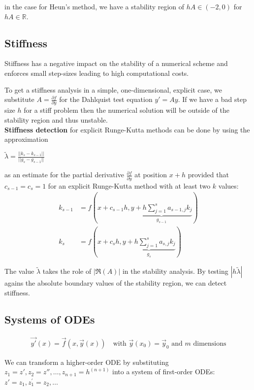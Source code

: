 in the case for Heun's method, we have a stability region of
$hA\in(-2,0)$ for $hA\in\mathbb{R}$.

\subsection{Stiffness}

Stiffness has a negative impact on the stability of a numerical scheme and enforces small step-sizes
leading to high computational costs.

To get a stiffness analysis in a simple, one-dimensional, explicit case, we substitute
$A=\frac{\partial f}{\partial y}$ for the Dahlquist test equation $y'=Ay$.
If we have a bad step size $h$ for a stiff problem then the numerical solution will be outside
of the stability region and thus unstable.
\\[1em]
\textbf{Stiffness detection} for explicit Runge-Kutta methods can be done by using the
approximation

\colorbox{shadecolor}{$
    \displaystyle
    \tilde{\lambda} = \frac{||k_s - k_{s-1}||}{||g_s - g_{s-1}||}
$}

as an estimate for the partial derivative $\frac{\partial f}{\partial y}$ at position $x+h$ provided
that $c_{s-1} = c_s = 1$ for an explicit Runge-Kutta method with at least two $k$ values:
\begin{align*}
    k_{s-1}
    & = f(x+c_{s-1}h,\underbrace{y+h\sum_{j=1}^{s}a_{s-1,j}k_{j}}_{g_{s-1}}) \\
    k_{s}
    & =f(x+c_{s}h,\underbrace{y+h\sum_{j=1}^{s}a_{s,j}k_{j}}_{g_{s}})
\end{align*}

The value $\tilde{\lambda}$ takes the role of $|\Re(A)|$ in the stability analysis.
By testing $|h\tilde\lambda|$ agains the absolute boundary values of the stability region,
we can detect stiffness.

\subsection{Systems of ODEs}
\begin{align*}
    {\vec{y'}}(x)={\vec{f}}(x,{\vec{y}}(x))\quad\text{with }{\vec{y}}(x_0)={\vec{y}}_0\text{ and }m\text{ dimensions}
\end{align*}

We can transform a higher-order ODE by substituting $z_1 = z', z_2 = z'', \ldots, z_{n+1} = h^{(n+1)}$
into a system of first-order ODEs: $z' = z_1, z_1^\prime = z_2, \ldots$
